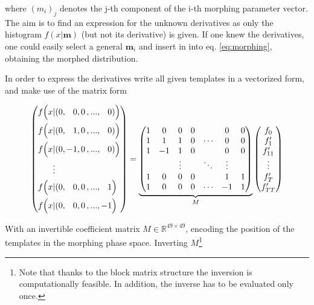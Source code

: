 where $(m_i)_j$ denotes the j-th component of the i-th morphing parameter vector. The aim is to find an expression for the unknown derivatives as only the histogram $f(x|\mathbf{m})$ (but not its derivative) is given. If one knew the derivatives, one could easily select a general $\mathbf{m}_i$ and insert in into eq. \ref{eq:morphing}, obtaining the morphed distribution.

In order to express the derivatives write all given templates in a vectorized form, and make use of the matrix form

\begin{equation*}
	\left(\begin{aligned}
		f\Bigl(x &| (0,\phantom{-}0, 0\,,...,\phantom{-}0)\Bigl) \\
		f\Bigl(x &| (0,\phantom{-}1, 0\,,...,\phantom{-}0)\Bigl) \\
		f\Bigl(x &| (0,-1, 0\,,...,\phantom{-}0)\Bigl) \\
		&\vdots \\
		f\Bigl(x &| (0,\phantom{-}0, 0\,,...,\phantom{-}1\Bigl) \\
		f\Bigl(x &| (0,\phantom{-}0, 0\,,...,-1\Bigl) \\
	\end{aligned}\right) = \underbrace{\left(\begin{matrix}
		1 & 0 & 0 & 0 & & 0 & 0 \\
		1 & 1 & 1 & 0 &  \cdots & 0 & 0 \\
		1 & -1 & 1 & 0 &      & 0 & 0 \\
		& & \vdots & & \ddots & \vdots & \\
		1 & 0 & 0 & 0 &       & 1 & 1 \\
		1 & 0 & 0 & 0 & \cdots & -1 & 1 \\
	\end{matrix}\right)}_{M} \left(\begin{matrix}
	f_0 \\
	f'_1 \\
	f'_{11} \\
	\vdots \\
	f'_T \\
	f'_{TT}
\end{matrix}\right)
\end{equation*}

With an invertible coefficient matrix $M \in \mathbb{R}^{49\times49}$, encoding the position of the templates in the morphing phase space. Inverting $M$\footnote{Note that thanks to the block matrix structure the inversion is computationally feasible. In addition, the inverse has to be evaluated only once.}

